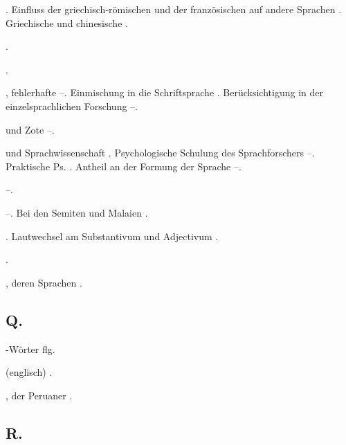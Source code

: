 \begin{register}
. Einfluss der griechisch-römischen und der französischen auf andere Sprachen \pageref{sp.271}. Griechische und chinesische \pageref{sp.414}.

 \pageref{sp.114}.


 \pageref{sp.101}.

, fehlerhafte \pageref{sp.44}–\pageref{sp.45}. Einmischung in die Schriftsprache \pageref{sp.62}. Berücksichtigung in der einzelsprachlichen Forschung \pageref{sp.125}–\pageref{sp.127}.

 und Zote \pageref{sp.248}–\pageref{sp.249}.

 und Sprachwissenschaft \pageref{sp.14}. Psychologische Schulung des Sprachforschers \pageref{sp.39}–\pageref{sp.47}. Praktische Ps. \pageref{sp.47}. Antheil an der Formung der Sprache \pageref{sp.95}–\pageref{sp.96}. 

 \pageref{sp.365}–\pageref{sp.373}.


 \pageref{sp.365}–\pageref{sp.373}. Bei den Semiten und Malaien \pageref{sp.391}.

 \pageref{sp.282}. Lautwechsel am Substantivum und Adjectivum \pageref{sp.391}.

 \pageref{sp.22}.

, deren Sprachen \pageref{sp.54}.

\subsection*{Q.}\label{reg.Q}

-Wörter \pageref{sp.466} flg.


 (englisch) \pageref{sp.230}.

,  der Peruaner \pageref{sp.128}.

\subsection*{R.}\label{reg.R}


\end{register}
